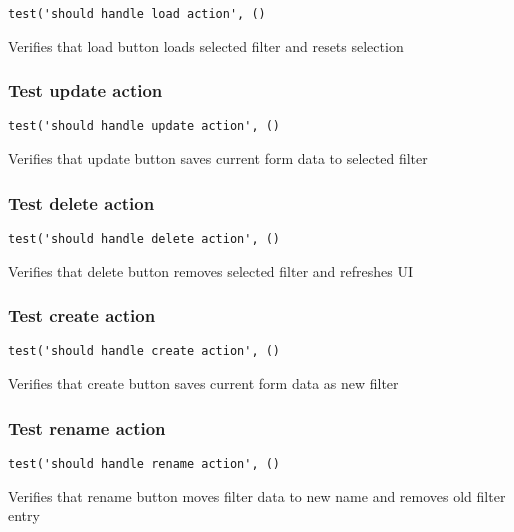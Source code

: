 \documentclass[a4paper]{article}
\begin{document}
\begin{lstlisting}
test('should handle load action', ()
\end{lstlisting}

Verifies that load button loads selected filter and resets selection

\hypertarget{toc167}{}
\subsubsection{Test update action}

\begin{lstlisting}
test('should handle update action', ()
\end{lstlisting}

Verifies that update button saves current form data to selected filter

\hypertarget{toc168}{}
\subsubsection{Test delete action}

\begin{lstlisting}
test('should handle delete action', ()
\end{lstlisting}

Verifies that delete button removes selected filter and refreshes UI

\hypertarget{toc169}{}
\subsubsection{Test create action}

\begin{lstlisting}
test('should handle create action', ()
\end{lstlisting}

Verifies that create button saves current form data as new filter

\hypertarget{toc170}{}
\subsubsection{Test rename action}

\begin{lstlisting}
test('should handle rename action', ()
\end{lstlisting}

Verifies that rename button moves filter data to new name
and removes old filter entry

\hypertarget{toc171}{}
\end{document}
